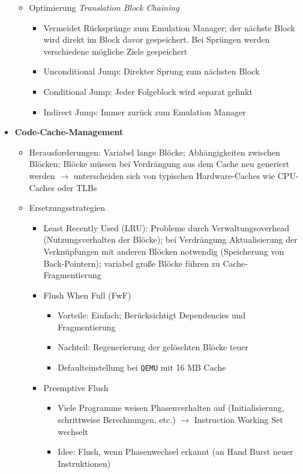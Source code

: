 \begin{itemize}
\begin{itemize}
		\item Optimierung \textit{Translation Block Chaining}
		\begin{itemize}
			\item Vermeidet Rücksprünge zum Emulation Manager; der nächste Block wird direkt im Block davor gespeichert. Bei Sprüngen werden verschiedene mögliche Ziele gespeichert
			\item Unconditional Jump: Direkter Sprung zum nächsten Block
			\item Conditional Jump: Jeder Folgeblock wird separat gelinkt
			\item Indirect Jump: Immer zurück zum Emulation Manager
		\end{itemize}
	\end{itemize}
	\item \textbf{Code-Cache-Management}
	\begin{itemize}
		\item Herausforderungen: Variabel lange Blöcke; Abhängigkeiten zwischen Blöcken; Blöcke müssen bei Verdrängung aus dem Cache neu generiert werden \(\rightarrow\) unterscheiden sich von typischen Hardware-Caches wie CPU-Caches oder TLBs
		\item Ersetzungsstrategien
		\begin{itemize}
			\item Least Recently Used (LRU): Probleme durch Verwaltungsoverhead (Nutzungsverhalten der Blöcke); bei Verdrängung Aktualisierung der Verknüpfungen mit anderen Blöcken notwendig (Speicherung von Back-Pointern); variabel große Blöcke führen zu Cache-Fragmentierung
			\item Flush When Full (FwF)
			\begin{itemize}
				\item Vorteile: Einfach; Berücksichtigt Dependencies und Fragmentierung
				\item Nachteil: Regenerierung der gelöschten Blöcke teuer
				\item Defaulteinstellung bei \texttt{QEMU} mit 16 MB Cache
			\end{itemize}
			\item Preemptive Flush
			\begin{itemize}
				\item Viele Programme weisen Phasenverhalten auf (Initialisierung, schrittweise Berechnungen, etc.) \(\rightarrow\) Instruction Working Set wechselt
				\item Idee: Flush, wenn Phasenwechsel erkannt (an Hand Burst neuer Instruktionen)
			\end{itemize}

\end{itemize}
\end{itemize}
\end{itemize}
